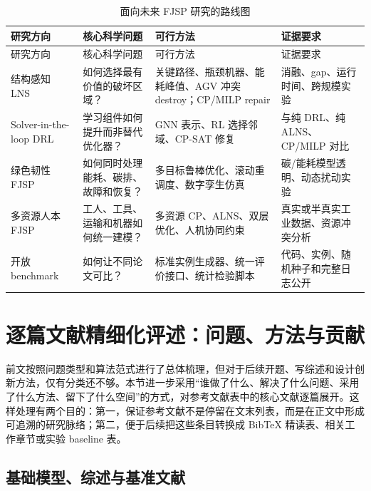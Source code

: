 \documentclass[UTF8,a4paper,11pt]{ctexart}
\begin{document}
\begin{longtable}{p{3.2cm}p{4.0cm}p{4.0cm}p{3.8cm}}
\caption{面向未来 FJSP 研究的路线图}\label{tab:roadmap}\\
\toprule
研究方向 & 核心科学问题 & 可行方法 & 证据要求 \\
\midrule
\endfirsthead
\toprule
研究方向 & 核心科学问题 & 可行方法 & 证据要求 \\
\midrule
\endhead
结构感知 LNS & 如何选择最有价值的破坏区域？ & 关键路径、瓶颈机器、能耗峰值、AGV 冲突 destroy；CP/MILP repair & 消融、gap、运行时间、跨规模实验 \\
Solver-in-the-loop DRL & 学习组件如何提升而非替代优化器？ & GNN 表示、RL 选择邻域、CP-SAT 修复 & 与纯 DRL、纯 ALNS、CP/MILP 对比 \\
绿色韧性 FJSP & 如何同时处理能耗、碳排、故障和恢复？ & 多目标鲁棒优化、滚动重调度、数字孪生仿真 & 碳/能耗模型透明、动态扰动实验 \\
多资源人本 FJSP & 工人、工具、运输和机器如何统一建模？ & 多资源 CP、ALNS、双层优化、人机协同约束 & 真实或半真实工业数据、资源冲突分析 \\
开放 benchmark & 如何让不同论文可比？ & 标准实例生成器、统一评价接口、统计检验脚本 & 代码、实例、随机种子和完整日志公开 \\
\bottomrule
\end{longtable}


\section{逐篇文献精细化评述：问题、方法与贡献}

前文按照问题类型和算法范式进行了总体梳理，但对于后续开题、写综述和设计创新方法，仅有分类还不够。本节进一步采用“谁做了什么、解决了什么问题、采用了什么方法、留下了什么空间”的方式，对参考文献表中的核心文献逐篇展开。这样处理有两个目的：第一，保证参考文献不是停留在文末列表，而是在正文中形成可追溯的研究脉络；第二，便于后续把这些条目转换成 BibTeX 精读表、相关工作章节或实验 baseline 表。

\subsection{基础模型、综述与基准文献}
\end{document}
